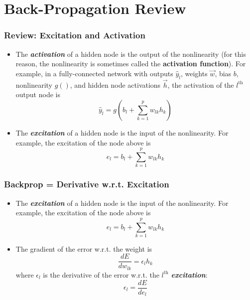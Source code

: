 \documentclass{beamer}
\begin{document}
\section[Back-Prop]{Back-Propagation Review}
\setcounter{subsection}{1}

\begin{frame}
  \frametitle{Review: Excitation and Activation}
  \begin{itemize}
    \item The {\bf\em activation} of a hidden node is the output of
      the nonlinearity (for this reason, the nonlinearity is sometimes
      called the {\bf activation function}).  For example, in a
      fully-connected network with outputs $\hat{y}_l$, weights $\vec{w}$,
      bias $b$, nonlinearity $g()$, and hidden node activations
      $\vec{h}$, the activation of the $l^{\textrm{th}}$ output node
      is
      \[
      \hat{y}_l = g\left(b_{l}+\sum_{k=1}^p w_{lk} h_k\right)
      \]
    \item The {\bf\em excitation} of a hidden node is the input of the
      nonlinearity.  For example, the excitation of the node above is
      \[
      e_l=b_{l}+\sum_{k=1}^p w_{lk} h_k
      \]
  \end{itemize}
\end{frame}

\begin{frame}
  \frametitle{Backprop = Derivative w.r.t. Excitation}
  \begin{itemize}
    \item The {\bf\em excitation} of a hidden node is the input of the
      nonlinearity.  For example, the excitation of the node above is
      \[
      e_l = b_{l}+\sum_{k=1}^p w_{lk} h_k
      \]
    \item The gradient of the error w.r.t. the weight is
      \[
      \frac{dE}{d w_{lk}} = \epsilon_lh_k
      \]
      where $\epsilon_l$ is the derivative of the error w.r.t. the
      $l^{\textrm{th}}$ {\bf\em excitation}:
      \[
      \epsilon_l = \frac{dE}{de_l}
      \]
  \end{itemize}
\end{frame}
\end{document}
